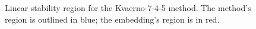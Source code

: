 \documentclass[letterpaper,10pt,english]{sphinxmanual}
\begin{document}
\begin{figure}[htbp]
\caption{Linear stability region for the Kvaerno-7-4-5 method.  The method's
region is outlined in blue; the embedding's region is in red.}\end{figure}
\end{document}
